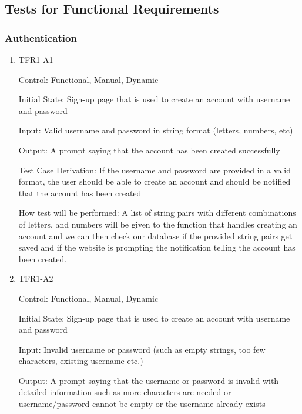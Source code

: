 \documentclass[12pt, titlepage]{article}
\begin{document}
\subsection{Tests for Functional Requirements}



  \subsubsection{Authentication}

  \begin{enumerate}
            
  \item{TFR1-A1\\} \label{TFR1-A1}
  
  Control: Functional, Manual, Dynamic
            
  Initial State: Sign-up page that is used to create an account with username and password
            
  Input: Valid username and password in string format (letters, numbers, etc)
            
  Output: A prompt saying that the account has been created successfully
  
  Test Case Derivation: If the username and password are provided in a valid format, the user should be able to create an account and should be notified that the account has been created
  
  How test will be performed: A list of string pairs with different combinations of letters, and numbers will be given to the function that handles creating an account and we can then check our database if the provided string pairs get saved and if the website is prompting the notification telling the account has been created. 
  
  \item{TFR1-A2\\} \label{TFR1-A2}
  
  Control: Functional, Manual, Dynamic
            
  Initial State: Sign-up page that is used to create an account with username and password
            
  Input: Invalid username or password (such as empty strings, too few characters, existing username etc.)
            
  Output: A prompt saying that the username or password is invalid with detailed information such as more characters are needed or username/password cannot be empty or the username already exists
  

\end{enumerate}
\end{document}
